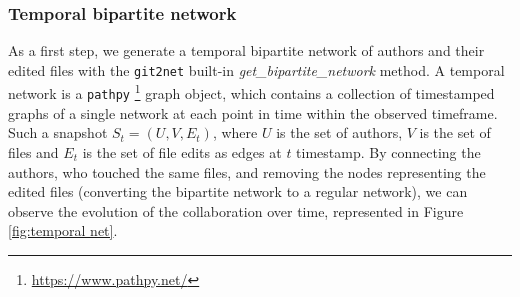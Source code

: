 \subsubsection{Temporal bipartite network}
As a first step, we generate a temporal bipartite network of authors and their edited files with the \texttt{git2net} built-in \textit{get\_bipartite\_network} method. A temporal network is a \texttt{pathpy} \footnote{\href{https://www.pathpy.net/}{https://www.pathpy.net/}} graph object, which contains a collection of timestamped graphs of a single network at each point in time within the observed timeframe. Such a snapshot $S_t = (U, V, E_t)$, where $U$ is the set of authors, $V$ is the set of files and $E_t$ is the set of file edits as edges at $t$ timestamp. By connecting the authors, who touched the same files, and removing the nodes representing the edited files (converting the bipartite network to a regular network), we can observe the evolution of the collaboration over time, represented in Figure \ref{fig:temporal net}. \\

